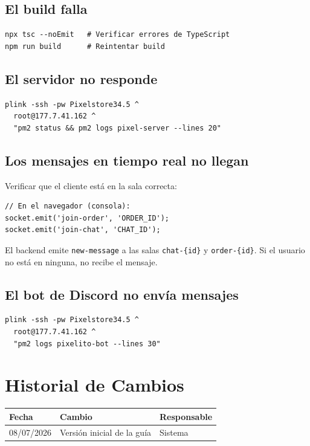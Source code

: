 \documentclass[12pt,a4paper]{article}
\begin{document}
\subsection{El build falla}

\begin{lstlisting}
npx tsc --noEmit   # Verificar errores de TypeScript
npm run build      # Reintentar build
\end{lstlisting}

\subsection{El servidor no responde}

\begin{lstlisting}
plink -ssh -pw Pixelstore34.5 ^
  root@177.7.41.162 ^
  "pm2 status && pm2 logs pixel-server --lines 20"
\end{lstlisting}

\subsection{Los mensajes en tiempo real no llegan}

Verificar que el cliente está en la sala correcta:

\begin{lstlisting}
// En el navegador (consola):
socket.emit('join-order', 'ORDER_ID');
socket.emit('join-chat', 'CHAT_ID');
\end{lstlisting}

El backend emite \texttt{new-message} a las salas \texttt{chat-\{id\}} y \texttt{order-\{id\}}. Si el usuario no está en ninguna, no recibe el mensaje.

\subsection{El bot de Discord no envía mensajes}

\begin{lstlisting}
plink -ssh -pw Pixelstore34.5 ^
  root@177.7.41.162 ^
  "pm2 logs pixelito-bot --lines 30"
\end{lstlisting}

\newpage

\section*{Historial de Cambios}

\begin{tabular}{|l|l|l|}
\hline
\textbf{Fecha} & \textbf{Cambio} & \textbf{Responsable} \\ \hline
08/07/2026 & Versión inicial de la guía & Sistema \\ \hline
\end{tabular}
\end{document}

